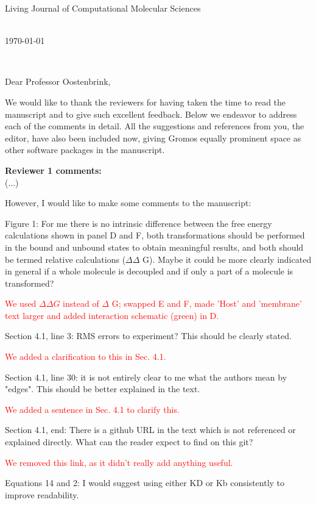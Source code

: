 \documentclass[11pt,a4paper]{letter} %
\def\opening#1{\thispagestyle{empty}
{\centering\fromaddress \vspace{1.2in} \\ %
\hspace*{}\today\hspace*{\fill}\par} %
{\raggedright \toname \\ \toaddress \par} %
\vspace{0.4in} %
\noindent #1 %
}
\begin{document}

\begin{letter}
{Living Journal of Computational Molecular Sciences\\
}

%


\opening{Dear Professor Oostenbrink,}


We would like to thank the reviewers for having taken the time to read the manuscript and to give such excellent feedback. Below we endeavor to address each of the comments in detail. All the suggestions and references from you, the editor, have also been included now, giving Gromos equally prominent space as other software packages in the manuscript.  


\textbf{Reviewer 1 comments:}\\
(...)

However, I would like to make some comments to the manuscript:

Figure 1: For me there is no intrinsic difference between the free energy calculations shown in panel D and F, both transformations should be performed in the bound and unbound states to obtain meaningful results, and both should be termed relative calculations ($\Delta \Delta$ G). Maybe it could be more clearly indicated in general if a whole molecule is decoupled and if only a part of a molecule is transformed?

\textcolor{red}{We used  $\Delta\Delta G$ instead of  $\Delta$ G; swapped E and F, made 'Host' and 'membrane' text larger and added interaction schematic (green) in D.}

Section 4.1, line 3: RMS errors to experiment? This should be clearly stated.

\textcolor{red}{We added a clarification to this in Sec. 4.1.}

Section 4.1, line 30: it is not entirely clear to me what the authors mean by "edges". This should be better explained in the text.

\textcolor{red}{We added a sentence in Sec. 4.1 to clarify this.}

Section 4.1, end: There is a github URL in the text which is not referenced or explained directly. What can the reader expect to find on this git?

\textcolor{red}{We removed this link, as it didn't really add anything useful.}

Equations 14 and 2: I would suggest using either KD or Kb consistently to improve readability.


\end{letter}
\end{document}
